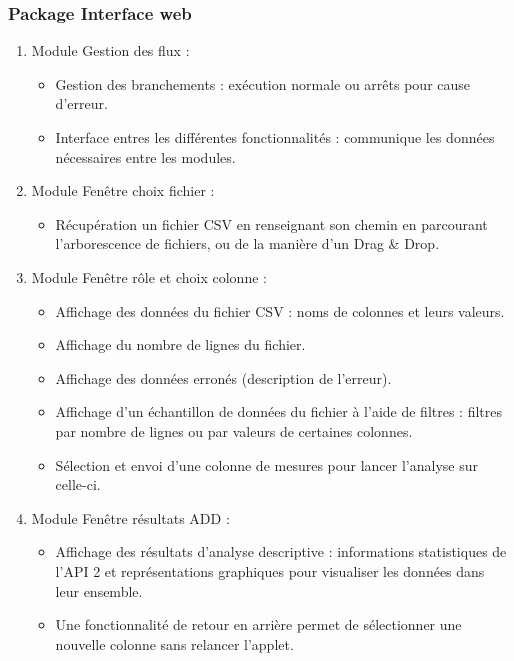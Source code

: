 			\subsubsection*{Package Interface web}
			\begin{enumerate}
				\item Module Gestion des flux :
					\begin{itemize}[leftmargin=*]
					\item Gestion des branchements : exécution normale ou arrêts pour cause d'erreur.
					\item Interface entres les différentes fonctionnalités : communique les données nécessaires entre les modules.
					\end{itemize}
				\item Module Fenêtre choix fichier :
					\begin{itemize}[leftmargin=*]
					\item Récupération un fichier CSV en renseignant son chemin en parcourant l'arborescence de fichiers, ou de la manière d'un Drag \& Drop.
					\end{itemize}
				\item Module Fenêtre rôle et choix colonne :
					\begin{itemize}[leftmargin=*]
					\item Affichage des données du fichier CSV : noms de colonnes et leurs valeurs.
					\item Affichage du nombre de lignes du fichier.
					\item Affichage des données erronés (description de l'erreur).
					\item Affichage d'un échantillon de données du fichier à l'aide de filtres : filtres par nombre de lignes ou par valeurs de certaines colonnes.
					\item Sélection et envoi d'une colonne de mesures pour lancer l'analyse sur celle-ci. 
					\end{itemize}
				\item Module Fenêtre résultats ADD :
					\begin{itemize}[leftmargin=*]
					\item Affichage des résultats d'analyse descriptive : informations statistiques de l'API 2 et représentations graphiques pour visualiser les données dans leur ensemble.
					\item Une fonctionnalité de retour en arrière permet de sélectionner une nouvelle colonne sans relancer l'applet.
					\end{itemize}
				\end{enumerate}
		
